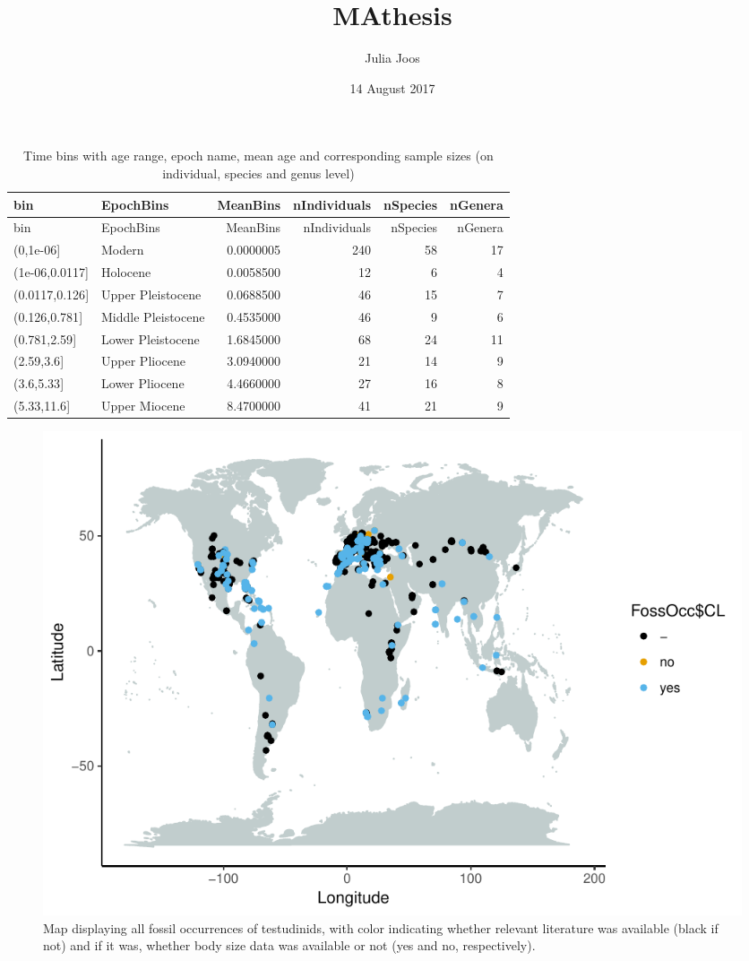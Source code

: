 \documentclass[]{article}
\title{MAthesis}
\author{Julia Joos}
\date{14 August 2017}
\begin{document}
\maketitle

\begin{longtable}[]{@{}llrrrr@{}}
\caption{Time bins with age range, epoch name, mean age and
corresponding sample sizes (on individual, species and genus
level)}\tabularnewline
\toprule
bin & EpochBins & MeanBins & nIndividuals & nSpecies &
nGenera\tabularnewline
\midrule
\endfirsthead
\toprule
bin & EpochBins & MeanBins & nIndividuals & nSpecies &
nGenera\tabularnewline
\midrule
\endhead
(0,1e-06{]} & Modern & 0.0000005 & 240 & 58 & 17\tabularnewline
(1e-06,0.0117{]} & Holocene & 0.0058500 & 12 & 6 & 4\tabularnewline
(0.0117,0.126{]} & Upper Pleistocene & 0.0688500 & 46 & 15 &
7\tabularnewline
(0.126,0.781{]} & Middle Pleistocene & 0.4535000 & 46 & 9 &
6\tabularnewline
(0.781,2.59{]} & Lower Pleistocene & 1.6845000 & 68 & 24 &
11\tabularnewline
(2.59,3.6{]} & Upper Pliocene & 3.0940000 & 21 & 14 & 9\tabularnewline
(3.6,5.33{]} & Lower Pliocene & 4.4660000 & 27 & 16 & 8\tabularnewline
(5.33,11.6{]} & Upper Miocene & 8.4700000 & 41 & 21 & 9\tabularnewline
\bottomrule
\end{longtable}

\begin{figure}[htbp]
\centering
\includegraphics{MA_JJ_files/figure-latex/Map fossil occurrences-1.pdf}
\caption{Map displaying all fossil occurrences of testudinids, with
color indicating whether relevant literature was available (black if
not) and if it was, whether body size data was available or not (yes and
no, respectively).}
\end{figure}
\end{document}
